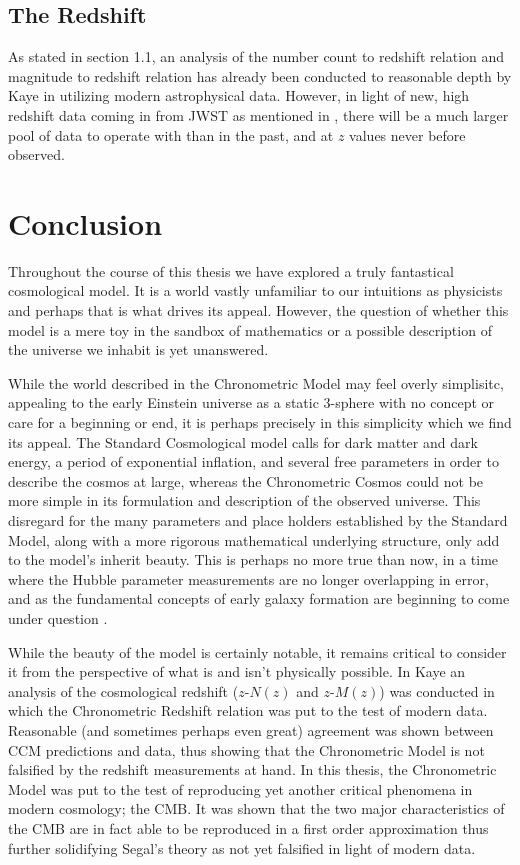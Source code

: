 \documentclass[a4paper]{article}
\begin{document}
    \subsection{The Redshift}
    As stated in section 1.1, an analysis of the number count to redshift
    relation and magnitude to redshift relation has already been
    conducted to reasonable depth by Kaye in \cite{kaye} utilizing modern
    astrophysical data. However, in light of new, high redshift data coming in
    from JWST as mentioned in \cite{labbe}, there will be a much larger pool of
    data to operate with than in the past, and at $z$ values never before
    observed.
    \newpage

    \section{Conclusion}
    Throughout the course of this thesis we have explored a truly fantastical
    cosmological model. It is a world vastly unfamiliar to our intuitions as
    physicists and perhaps that is what drives its appeal. However, the
    question of whether this model is a mere toy in the sandbox of mathematics or a
    possible description of the universe we inhabit is yet unanswered. 

    While the world described in the Chronometric Model may feel overly
    simplisitc, appealing to the early Einstein universe as a static 3-sphere
    with no concept or care for a beginning or end, it is perhaps precisely in
    this simplicity which we find its appeal. The Standard Cosmological model
    calls for dark matter and dark energy, a period of exponential inflation,
    and several free parameters in order to describe the cosmos at large,
    whereas the Chronometric Cosmos could not be more simple in its
    formulation and description of the observed universe. This disregard for
    the many parameters and place holders established by the Standard Model,
    along with a more rigorous mathematical underlying structure, only add to
    the model's inherit beauty. This is perhaps no more true than now, in a
    time where the Hubble parameter measurements are no longer overlapping in
    error, and as the fundamental concepts of early galaxy formation are
    beginning to come under question \cite{labbe} \cite{hub_const}.

    While the beauty of the model is certainly notable, it remains critical to
    consider it from the perspective of what is and isn't physically possible.
    In Kaye \cite{kaye} an analysis of the cosmological redshift ($z$-$N(z)$
    and $z$-$M(z)$) was conducted in which the Chronometric Redshift relation
    was put to the test of modern data. Reasonable (and sometimes perhaps even
    great) agreement was shown between CCM predictions and data, thus showing
    that the Chronometric Model is not falsified by the redshift measurements
    at hand. In this thesis, the Chronometric Model was put to the test of
    reproducing yet another critical phenomena in modern cosmology; the CMB. It
    was shown that the two major characteristics of the CMB are in fact able to
    be reproduced in a first order approximation thus further solidifying
    Segal's theory as not yet falsified in light of modern data.
\end{document}
